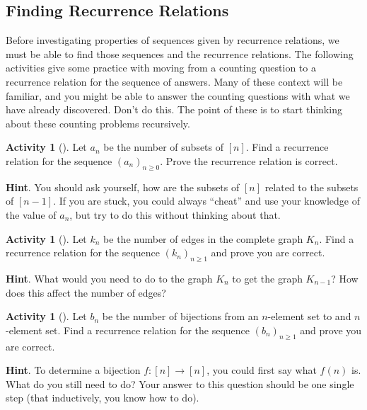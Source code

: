 \documentclass[10pt,]{book}
\theoremstyle{plain}
\theoremstyle{definition}
\theoremstyle{definition}
\theoremstyle{definition}
\newtheorem{activity}[project]{Activity}
\theoremstyle{definition}
\numberwithin{equation}{chapter}
\begin{document}
\subsection[{Finding Recurrence Relations}]{Finding Recurrence Relations}\label{subsec-recursionfinding}
\hypertarget{p-797}{}%
Before investigating properties of sequences given by recurrence relations, we must be able to find those sequences and the recurrence relations.  The following activities give some practice with moving from a counting question to a recurrence relation for the sequence of answers.  Many of these context will be familiar, and you might be able to answer the counting questions with what we have already discovered.  Don't do this.  The point of these is to start thinking about these counting problems recursively.%
\begin{activity}[]\label{activity-77}
\hypertarget{p-798}{}%
Let \(a_n\) be the number of subsets of \([n]\).  Find a recurrence relation for the sequence \((a_n)_{n \ge 0}\).  Prove the recurrence relation is correct.%
\par\smallskip%
\noindent\textbf{Hint}.\hypertarget{hint-69}{}\quad%
\hypertarget{p-799}{}%
You should ask yourself, how are the subsets of \([n]\) related to the subsets of \([n-1]\).  If you are stuck, you could always ``cheat'' and use your knowledge of the value of \(a_n\), but try to do this without thinking about that.%
\end{activity}
\begin{activity}[]\label{activity-78}
\hypertarget{p-800}{}%
Let \(k_n\) be the number of edges in the complete graph \(K_n\).  Find a recurrence relation for the sequence \((k_n)_{n \ge 1}\) and prove you are correct.%
\par\smallskip%
\noindent\textbf{Hint}.\hypertarget{hint-70}{}\quad%
\hypertarget{p-801}{}%
What would you need to do to the graph \(K_n\) to get the graph \(K_{n-1}\)?  How does this affect the number of edges?%
\end{activity}
\begin{activity}[]\label{activity-79}
\hypertarget{p-802}{}%
Let \(b_n\) be the number of bijections from an \(n\)-element set to and \(n\)-element set.  Find a recurrence relation for the sequence \((b_n)_{n \ge 1}\) and prove you are correct.%
\par\smallskip%
\noindent\textbf{Hint}.\hypertarget{hint-71}{}\quad%
\hypertarget{p-803}{}%
To determine a bijection \(f:[n] \to [n]\), you could first say what \(f(n)\) is.  What do you still need to do?  Your answer to this question should be one single step (that inductively, you know how to do).%
\end{activity}
\end{document}
